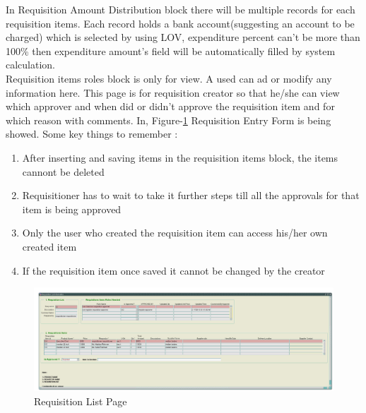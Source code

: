 \documentclass[12pt]{report} %
\begin{document}
In Requisition Amount Distribution block there will be multiple records for each requisition items. Each record holds a bank account(suggesting an account to be charged) which is selected by using LOV, expenditure percent can't be more than 100\% then expenditure amount's field will be automatically filled by system calculation.\\

Requisition items roles block is only for view. A used can ad or modify any information here. This page is for requisition creator so that he/she can view which approver and when did or didn't approve the requisition item and for which reason with comments.
In, Figure-\ref{fig:req_list_page} Requisition Entry Form is being showed. Some key things to remember :

\renewcommand{\labelenumi}{\alph{enumi})}
\begin{enumerate}

		\item After inserting and saving items in the requisition items block, the items cannont be deleted
		\item Requisitioner has to wait to take it further steps till all the approvals for that item is being approved
		\item Only the user who created the requisition item can access his/her own created item
		\item If the requisition item once saved it cannot be changed by the creator
\end{enumerate}



\begin{landscape}

\begin{figure}[h]
	\begin{center}
	\includegraphics[width=1.35\textwidth]{pic/req_list_page.PNG}
	\end{center}
	\caption{Requisition List Page}
	\label{fig:req_list_page}
\end{figure}
\thispagestyle{empty} 
\end{landscape}
\clearpage
\end{document}
